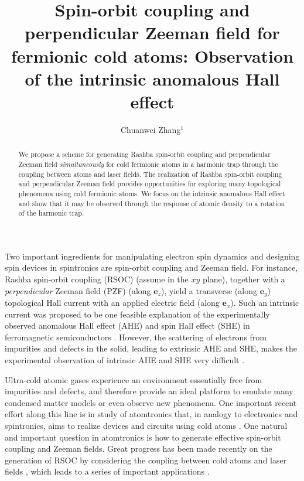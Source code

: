 \documentclass[pra,twocolumn,showpacs,floatfix]{revtex4-1}
\begin{document}
\title{Spin-orbit coupling and perpendicular Zeeman field for fermionic cold
atoms: Observation of the intrinsic anomalous Hall effect}
\author{Chuanwei Zhang$^{1}$}

\begin{abstract}
We propose a scheme for generating Rashba spin-orbit coupling and
perpendicular Zeeman field \textit{simultaneously} for cold fermionic atoms
in a harmonic trap through the coupling between atoms and laser fields. The
realization of Rashba spin-orbit coupling and perpendicular Zeeman field
provides opportunities for exploring many topological phenomena using cold
fermionic atoms. We focus on the intrinsic anomalous Hall effect and show
that it may be observed through the response of atomic density to a rotation
of the harmonic trap.
\end{abstract}
\maketitle



Two important ingredients for manipulating electron spin dynamics and
designing spin devices in spintronics \cite{Sarma} are spin-orbit coupling
and Zeeman field. For instance, Rashba spin-orbit coupling (RSOC) (assume in
the $xy$ plane), together with a \textit{perpendicular} Zeeman field (PZF)
(along $\mathbf{e}_{z}$), yield a transverse (along $\mathbf{e}_{y}$)
topological Hall current with an applied electric field (along $\mathbf{e}%
_{x}$). Such an intrinsic current was proposed to be one feasible
explanation of the experimentally observed anomalous Hall effect (AHE) and
spin Hall effect (SHE) in ferromagnetic semiconductors \cite{Niu1,Niu3}.
However, the scattering of electrons from impurities and defects in the
solid, leading to extrinsic AHE and SHE, makes the experimental observation
of intrinsic AHE and SHE very difficult \cite{Nagaosa}.

Ultra-cold atomic gases experience an environment essentially free from
impurities and defects, and therefore provide an ideal platform to emulate
many condensed matter models or even observe new phenomena. One important
recent effort along this line is in study of atomtronics that, in analogy to
electronics and spintronics, aims to realize devices and circuits using cold
atoms \cite{Holland}. One natural and important question in atomtronics is
how to generate effective spin-orbit coupling and Zeeman fields. Great
progress has been made recently on the generation of RSOC by considering the
coupling between cold atoms and laser fields \cite{Ruseckas,Zhu,Liu,Liu2},
which leads to a series of important applications \cite%
{Ruseckas2,Clark1,Clark2,Zhang}.
\end{document}
